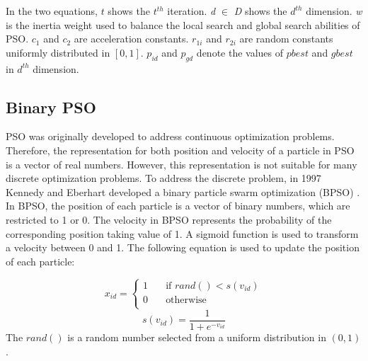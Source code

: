 In the two equations, $t$ shows the $t^{th}$ iteration. \emph{d} $\in$ \emph{D} 
shows the $d^{th}$ dimension. \emph{w} is the inertia weight used to balance the local search and 
global search abilities of PSO. $c_1$ and $c_2$ are acceleration constants. 
$r_{1i}$ and $r_{2i}$ are random constants uniformly distributed in $[0, 1]$. $p_{id}$ and $p_{gd}$ denote the values of $pbest$ and $gbest$ in $d^{th}$ dimension.

\subsection{Binary PSO}
PSO was originally developed to address continuous optimization problems. 
Therefore, the representation for both position and velocity of a particle in 
PSO is a vector of real numbers. However, this representation is not suitable 
for many discrete optimization problems. To address the discrete problem, in 1997 
Kennedy and Eberhart developed a binary 
particle swarm optimization (BPSO) \cite{637339}.
In BPSO, the position of each particle is a vector of binary numbers, which are 
restricted to 1 or 0.  The velocity in BPSO represents the probability of the 
corresponding position taking value of 1. A sigmoid function is used to transform a velocity
between 0 and 1. The following equation is 
used to update the position of each particle:

\begin{equation}
\label{eq:updatePosition}
		x_{id} = 
		\begin{cases}
			1 & \quad \text{if } rand() < s(v_{id})\\
			0 & \quad \text{otherwise} \\
		\end{cases}
\end{equation}
\begin{equation}
\label{eq:updateVelocity}
	s(v_{id}) = \frac{1}{1 + e^{-v_{id}}}
\end{equation}
The $rand()$ is a random number selected from a uniform distribution in $(0, 1)$.

